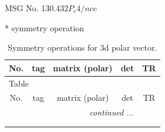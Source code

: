 \documentclass[fleqn,8pt]{jsarticle}
\begin{document}
\setcounter{MaxMatrixCols}{32}

\renewcommand{\tablename}{Table~}
\renewcommand{\figurename}{Figure~}
\begin{center}
\LARGE
MSG No. 130.432\quad$P_{c}4/ncc$
\end{center}
* symmetry operation
\renewcommand{\arraystretch}{1.3}
\begin{longtable}{ccccc}
\caption{Symmetry operations for 3d polar vector.}
 \\
 \hline \hline
No. & tag & matrix (polar) & det & TR \\ \hline \endfirsthead

\multicolumn{4}{l}{\tablename\ \thetable{}} \\
 \hline \hline
No. & tag & matrix (polar) & det & TR \\ \hline \endhead

 \hline \hline
\multicolumn{4}{r}{\footnotesize\it continued ...} \\ \endfoot

 \hline \hline
\multicolumn{4}{r}{} \\ \endlastfoot


\end{longtable}
\end{document}
